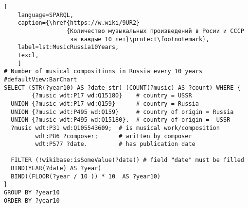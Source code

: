 \begin{lstlisting}[ 
    language=SPARQL,
    caption={\href{https://w.wiki/9UR2}
                  {Количество музыкальных произведений в Росии и СССР 
                   за каждые 10 лет}\protect\footnotemark},
    label=lst:MusicRussia10Years,
    texcl,
    ]
# Number of musical compositions in Russia every 10 years
#defaultView:BarChart
SELECT (STR(?year10) AS ?date_str) (COUNT(?music) AS ?count) WHERE {
        {?music wdt:P17 wd:Q15180}    # country = USSR
  UNION {?music wdt:P17 wd:Q159}      # country = Russia
  UNION {?music wdt:P495 wd:Q159}     # country of origin = Russia
  UNION {?music wdt:P495 wd:Q15180}.  # country of origin =  USSR
  ?music wdt:P31 wd:Q105543609;  # is musical work/composition
         wdt:P86 ?composer;      # written by composer
         wdt:P577 ?date.         # has publication date

  FILTER (!wikibase:isSomeValue(?date)) # field "date" must be filled
  BIND(YEAR(?date) AS ?year)
  BIND((FLOOR(?year / 10 )) * 10  AS ?year10)
}
GROUP BY ?year10
ORDER BY ?year10
\end{lstlisting}%


